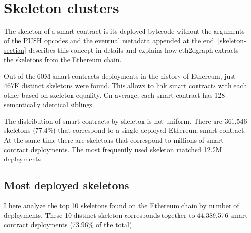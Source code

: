 \newpage

\section{Skeleton clusters}

The skeleton of a smart contract is its deployed bytecode without the arguments of the PUSH opcodes and the eventual metadata appended at the end. \cref{skeleton-section} describes this concept in details and explains how eth2dgraph extracts the skeletons from the Ethereum chain.

Out of the 60M smart contracts deployments in the history of Ethereum, just 467K distinct skeletons were found. This allows to link smart contracts with each other based on skeleton equality. On average, each smart contract has 128 semantically identical siblings. 

The distribution of smart contracts by skeleton is not uniform. There are 361,546 skeletons (77.4\%) that correspond to a single deployed Ethereum smart contract. At the same time there are skeletons that correspond to millions of smart contract deployments. The most frequently used skeleton matched 12.2M deployments.

\subsection{Most deployed skeletons}

I here analyze the top 10 skeletons found on the Ethereum chain by number of deployments. These 10 distinct skeleton corresponds together to 44,389,576 smart contract deployments (73.96\% of the total).

